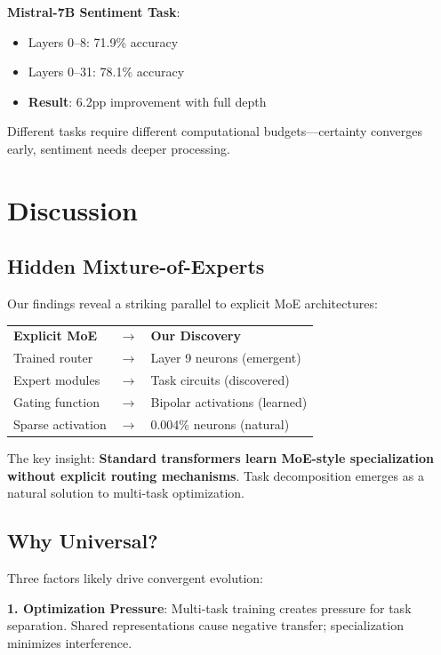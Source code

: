 \documentclass{article}
\begin{document}
\textbf{Mistral-7B Sentiment Task}:
\begin{itemize}
    \item Layers 0--8: 71.9\% accuracy
    \item Layers 0--31: 78.1\% accuracy
    \item \textbf{Result}: 6.2pp improvement with full depth
\end{itemize}

Different tasks require different computational budgets—certainty converges early, sentiment needs deeper processing.

\section{Discussion}

\subsection{Hidden Mixture-of-Experts}

Our findings reveal a striking parallel to explicit MoE architectures:

\begin{center}
\begin{tabular}{lll}
\textbf{Explicit MoE} & $\rightarrow$ & \textbf{Our Discovery} \\
Trained router & $\rightarrow$ & Layer 9 neurons (emergent) \\
Expert modules & $\rightarrow$ & Task circuits (discovered) \\
Gating function & $\rightarrow$ & Bipolar activations (learned) \\
Sparse activation & $\rightarrow$ & 0.004\% neurons (natural) \\
\end{tabular}
\end{center}

The key insight: \textbf{Standard transformers learn MoE-style specialization without explicit routing mechanisms}. Task decomposition emerges as a natural solution to multi-task optimization.

\subsection{Why Universal?}

Three factors likely drive convergent evolution:

\textbf{1. Optimization Pressure}: Multi-task training creates pressure for task separation. Shared representations cause negative transfer; specialization minimizes interference.
\end{document}
